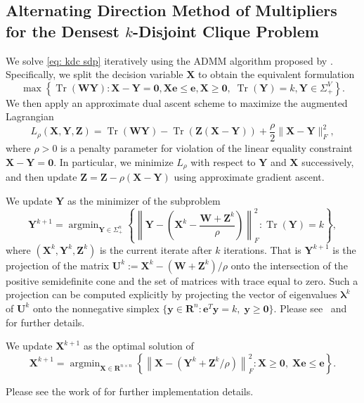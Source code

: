 \documentclass[twoside,11pt]{article}
\newcommand{\R}{\mathbf{R}}
\newcommand{\Z}{\bs{Z}}
\DeclareMathOperator*{\argmin}{\arg\min}
\DeclareMathOperator{\tr}{{Tr}}
\newcommand{\e}{\bs {e}}
\newcommand{\bs}{\boldsymbol}
\newcommand{\X}{\bs {X}}
\newcommand{\y}{\bs {y}}
\newcommand{\Y}{\bs {Y}}
\newcommand{\W}{\bs {W}}
\newcommand{\0}{\bs{0}}
\newcommand{\rbra}[1]{\ensuremath{\left( #1 \right)}} %
\newcommand{\bra}[1]{\ensuremath{\left\{ #1 \right\}}} %
\newcommand{\eq}[1]{\(#1\)}
\begin{document}
{\subsection{Alternating Direction Method of Multipliers for the Densest $k$-Disjoint Clique Problem}
We solve \eqref{eq: kdc sdp} iteratively using the ADMM algorithm proposed by \cite{ames2014guaranteed}.
Specifically, we split the decision variable \eq{\X} to obtain the equivalent formulation
\begin{equation} \label{eq: kdc admm}
\max \bra{ \tr(\W\Y) : \X - \Y = \0, \X\e \le \e, \X \ge \0, \; \tr(\Y) = k, \Y \in \Sigma^V_+ }.
\end{equation}
We then apply an approximate dual ascent scheme to maximize the augmented Lagrangian
\[
L_\rho(\X,\Y,\Z) = \tr(\W\Y) - \tr(\Z(\X-\Y) ) + \frac{\rho}{2} \| \X - \Y\|^2_F,
\]
where \(\rho > 0\) is a penalty parameter for violation of the linear equality constraint  \(\X-\Y = \0\).
In particular, we minimize \(L_\rho\) with respect to \(\Y\) and \(\X\) successively, and then update
\(\Z = \Z - \rho(\X-\Y)\) using approximate gradient ascent.

We update $\Y$ as the minimizer of the subproblem
\begin{equation}\label{eq: Y subprob}
	\Y^{k+1} = \argmin_{\Y \in \Sigma^n_+} \bra{  \left\| \Y - \rbra{ \X^k - \frac{\W + \Z^k}{\rho}}\right\|^2_F : \tr(\Y) = k},
\end{equation}
where $(\X^k, \Y^k, \Z^k)$ is the current iterate after $k$ iterations.
That is $\Y^{k+1}$ is the projection of the matrix $\bs{U}^k := \X^k - (\W + \Z^k)/\rho$ onto the intersection of the positive semidefinite cone and the set of matrices with trace equal to zero.
Such a projection can be computed explicitly by projecting the vector of eigenvalues $\bs{\lambda}^k$ of $\bs{U}^k$ onto the nonnegative simplex $\{\y \in \R^n: \e^T \y = k, \; \y \ge \bs 0\}$.
Please see~\citet[Proposition~2.6] {zhang2011penalty} and \citet{van2008probing} for further details.

We update $\X^{k+1}$ as the optimal solution of
\begin{equation}\label{eq:X-subprob}
	\X^{k+1} = \argmin_{\X \in \R^{n\times n}} \bra{ \left\|\X - \rbra{\Y^k + \Z^k/\rho} \right\|^2_F: \X \ge \0, \; \X \e \le \e }.
\end{equation}




Please see the work of \citet[Section 6]{ames2014guaranteed} for further implementation details.

}
\end{document}
